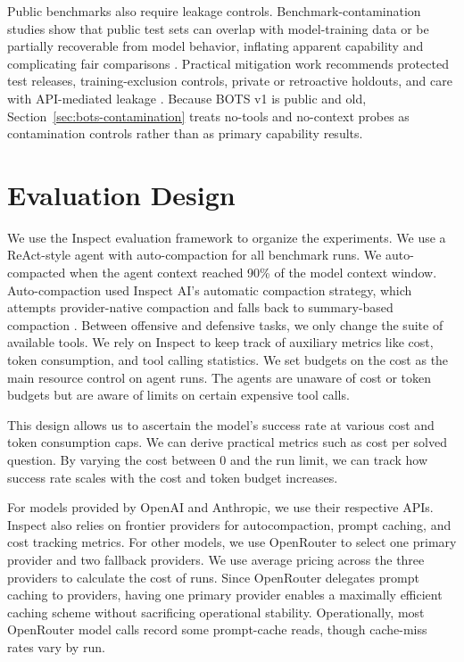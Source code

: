 \documentclass{jmlr}%
\newcommand{\Inspect}{Inspect}
\begin{document}
Public benchmarks also require leakage controls.
Benchmark-contamination studies show that public test sets can overlap with model-training data or be partially recoverable from model behavior, inflating apparent capability and complicating fair comparisons \citep{deng2024datacontamination,wang2024benchmarkleakage,li2024contaminationsurvey}.
Practical mitigation work recommends protected test releases, training-exclusion controls, private or retroactive holdouts, and care with API-mediated leakage \citep{jacovi2023testdata,balloccu2024leak,haimes2024benchmarkinflation}.
Because BOTS v1 is public and old, Section~\ref{sec:bots-contamination} treats no-tools and no-context probes as contamination controls rather than as primary capability results.

\section{Evaluation Design}
\label{sec:evaluation-design}

We use the Inspect evaluation framework \citep{inspect_ai_2024} to organize the experiments.
We use a ReAct-style agent with auto-compaction \citep{yao2023react} for all benchmark runs.
We auto-compacted when the agent context reached 90\% of the model context window.
Auto-compaction used Inspect AI's automatic compaction strategy, which attempts provider-native compaction and falls back to summary-based compaction \citep{inspect_ai_compaction_source}.
Between offensive and defensive tasks, we only change the suite of available tools.
We rely on \Inspect{} to keep track of auxiliary metrics like cost, token consumption, and tool calling statistics.
We set budgets on the cost as the main resource control on agent runs.
The agents are unaware of cost or token budgets but are aware of limits on certain expensive tool calls.

This design allows us to ascertain the model's success rate at various cost and token consumption caps.
We can derive practical metrics such as cost per solved question.
By varying the cost between 0 and the run limit, we can track how success rate scales with the cost and token budget increases.

For models provided by OpenAI and Anthropic, we use their respective APIs.
\Inspect{} also relies on frontier providers for autocompaction, prompt caching, and cost tracking metrics.
For other models, we use OpenRouter to select one primary provider and two fallback providers.
We use average pricing across the three providers to calculate the cost of runs.
Since OpenRouter delegates prompt caching to providers, having one primary provider enables a maximally efficient caching scheme without sacrificing operational stability.
Operationally, most OpenRouter model calls record some prompt-cache reads, though cache-miss rates vary by run.
\end{document}
